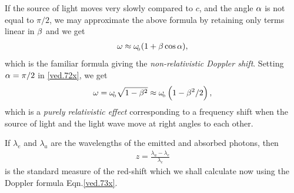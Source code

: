 If the source of light moves very slowly compared to 
$c$, 
and the angle ${\alpha} $ is not equal to $\pi/2 $, we may 
approximate the above formula by retaining only terms 
linear 
in ${\beta} $ and we get
\begin{align}\label{ved.76x}
{\omega}\approx
{\omega}_{_{\hspace*{-1.5pt}{0}}}(1 +{\beta} \cos{\alpha}),
\end{align}
which is the familiar formula 
giving the \textsl{non-relativistic Doppler shift}.
Setting  ${\alpha}=\pi/2$ in \eqref{ved.72x}, we get
\begin{equation}\label{ved.77x}
{\omega}={\omega}_{_{\hspace*{-1.5pt}{0}}}\sqrt{1-{\beta}^2}\approx
{\omega}_{_{\hspace*{-1.5pt}{0}}}\left(1-{\beta}^2/2 \right),
\end{equation}
which is a \textsl{purely relativistic effect} 
corresponding 
to a frequency shift when the source of light and the 
light 
wave move at right angles to each other.


\soln If $\lambda_e$ and $\lambda_a$ are the 
wavelengths of
the emitted and absorbed photons, then
\begin{align}
 z=\frac{\lambda_a - \lambda_e}{\lambda_e}
\end{align}
is the standard measure of the red-shift which we 
shall 
calculate now using the Doppler formula 
Eqn.\eqref{ved.73x}. 

